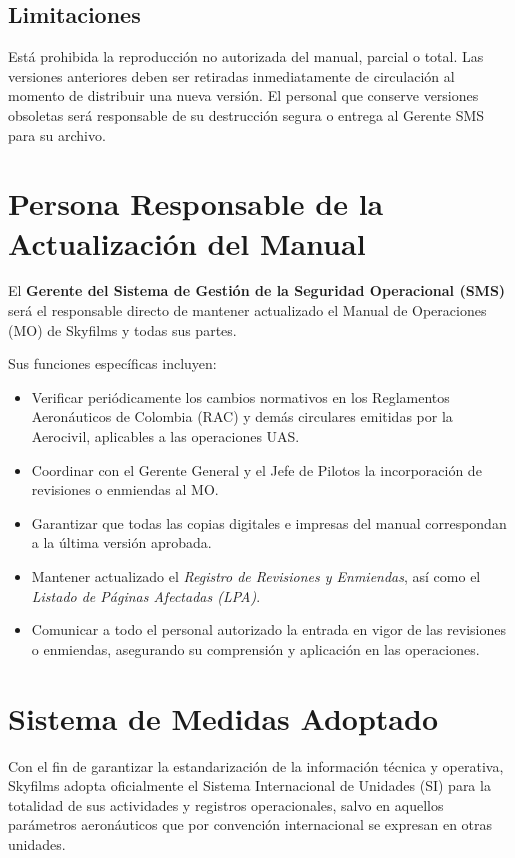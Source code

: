 \subsection*{Limitaciones}
Está prohibida la reproducción no autorizada del manual, parcial o total. Las versiones anteriores deben ser retiradas inmediatamente de circulación al momento de distribuir una nueva versión. El personal que conserve versiones obsoletas será responsable de su destrucción segura o entrega al Gerente SMS para su archivo.


\section*{Persona Responsable de la Actualización del Manual}
El \textbf{Gerente del Sistema de Gestión de la Seguridad Operacional (SMS)} será el responsable directo de mantener actualizado el Manual de Operaciones (MO) de Skyfilms y todas sus partes.  

Sus funciones específicas incluyen:  
\begin{itemize}
    \item Verificar periódicamente los cambios normativos en los Reglamentos Aeronáuticos de Colombia (RAC) y demás circulares emitidas por la Aerocivil, aplicables a las operaciones UAS.  
    \item Coordinar con el Gerente General y el Jefe de Pilotos la incorporación de revisiones o enmiendas al MO.  
    \item Garantizar que todas las copias digitales e impresas del manual correspondan a la última versión aprobada.  
    \item Mantener actualizado el \textit{Registro de Revisiones y Enmiendas}, así como el \textit{Listado de Páginas Afectadas (LPA)}.  
    \item Comunicar a todo el personal autorizado la entrada en vigor de las revisiones o enmiendas, asegurando su comprensión y aplicación en las operaciones.  
\end{itemize}




\section{Sistema de Medidas Adoptado}

Con el fin de garantizar la estandarización de la información técnica y operativa, Skyfilms adopta oficialmente el Sistema Internacional de Unidades (SI) para la totalidad de sus actividades y registros operacionales, salvo en aquellos parámetros aeronáuticos que por convención internacional se expresan en otras unidades.

